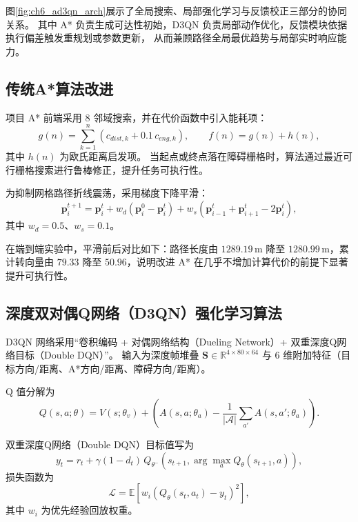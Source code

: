 \documentclass[UTF8,zihao=-4,a4paper,oneside,openany]{ctexrep}
\numberwithin{equation}{chapter}
\theoremstyle{plain}
\theoremstyle{definition}
\begin{document}
图\ref{fig:ch6_ad3qn_arch}展示了全局搜索、局部强化学习与反馈校正三部分的协同关系。
其中 A* 负责生成可达性初始，D3QN 负责局部动作优化，反馈模块依据执行偏差触发重规划或参数更新，
从而兼顾路径全局最优趋势与局部实时响应能力。

\subsection{传统A*算法改进}
\label{subsec:ch6_astar_improve}

项目 A* 前端采用 8 邻域搜索，并在代价函数中引入能耗项：
\begin{equation}
g(n)=\sum_{k=1}^{n}\left(c_{dist,k}+0.1\,c_{eng,k}\right),\qquad
f(n)=g(n)+h(n),
\label{eq:ch6_astar_cost}
\end{equation}
其中 $h(n)$ 为欧氏距离启发项。
当起点或终点落在障碍栅格时，算法通过最近可行栅格搜索进行鲁棒修正，提升任务可执行性。

为抑制网格路径折线震荡，采用梯度下降平滑：
\begin{equation}
\mathbf{p}_{i}^{t+1}=\mathbf{p}_{i}^{t}
+w_d\left(\mathbf{p}_{i}^{0}-\mathbf{p}_{i}^{t}\right)
+w_s\left(\mathbf{p}_{i-1}^{t}+\mathbf{p}_{i+1}^{t}-2\mathbf{p}_{i}^{t}\right),
\label{eq:ch6_path_smooth}
\end{equation}
其中 $w_d=0.5$、$w_s=0.1$。

在端到端实验中，平滑前后对比如下：路径长度由 $1289.19\,\mathrm{m}$ 降至 $1280.99\,\mathrm{m}$，累计转向量由 $79.33$ 降至 $50.96$，说明改进 A* 在几乎不增加计算代价的前提下显著提升可执行性。

\subsection{深度双对偶Q网络（D3QN）强化学习算法}
\label{subsec:ch6_d3qn}

D3QN 网络采用“卷积编码 + 对偶网络结构（Dueling Network）+ 双重深度Q网络目标（Double DQN）”。
输入为深度帧堆叠 $\mathbf{S}\in \mathbb{R}^{4\times80\times64}$ 与 6 维附加特征（目标方向/距离、A*方向/距离、障碍方向/距离）。

Q 值分解为
\begin{equation}
Q(s,a;\theta)=V(s;\theta_v)+\left(A(s,a;\theta_a)-\frac{1}{|\mathcal{A}|}\sum_{a'}A(s,a';\theta_a)\right).
\label{eq:ch6_dueling_q}
\end{equation}

双重深度Q网络（Double DQN）目标值写为
\begin{equation}
y_t=r_t+\gamma(1-d_t)\,Q_{\theta^-}\!\left(s_{t+1},
\arg\max_{a}Q_{\theta}(s_{t+1},a)\right),
\label{eq:ch6_ddqn_target}
\end{equation}
损失函数为
\begin{equation}
\mathcal{L}=\mathbb{E}\left[w_i\left(Q_{\theta}(s_t,a_t)-y_t\right)^2\right],
\label{eq:ch6_d3qn_loss}
\end{equation}
其中 $w_i$ 为优先经验回放权重。
\end{document}
